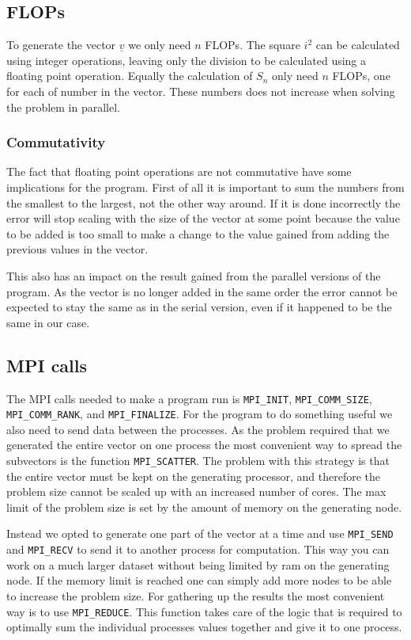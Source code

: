 \documentclass[a4paper, 12pt]{article}
\begin{document}
    \subsection{FLOPs}
    To generate the vector $\underline{v}$ we only need $n$ FLOPs. The square $i^2$ can be calculated using integer operations, leaving only the division to be calculated using a floating point operation. Equally the calculation of $S_n$ only need $n$ FLOPs, one for each of number in the vector. These numbers does not increase when solving the problem in parallel.

        \subsubsection{Commutativity}
        The fact that floating point operations are not commutative have some implications for the program. First of all it is important to sum the numbers from the smallest to the largest, not the other way around. If it is done incorrectly the error will stop scaling with the size of the vector at some point because the value to be added is too small to make a change to the value gained from adding the previous values in the vector.

        This also has an impact on the result gained from the parallel versions of the program. As the vector is no longer added in the same order the error cannot be expected to stay the same as in the serial version, even if it happened to be the same in our case.

    \subsection{MPI calls}
    The MPI calls needed to make a program run is \texttt{MPI\_INIT}, \texttt{MPI\_COMM\_SIZE}, \texttt{MPI\_COMM\_RANK}, and \texttt{MPI\_FINALIZE}. For the program to do something useful we also need to send data between the processes. As the problem required that we generated the entire vector on one process the most convenient way to spread the subvectors is the function \texttt{MPI\_SCATTER}. The problem with this strategy is that the entire vector must be kept on the generating processor, and therefore the problem size cannot be scaled up with an increased number of cores. The max limit of the problem size is set by the amount of memory on the generating node.

    Instead we opted to generate one part of the vector at a time and use \texttt{MPI\_SEND} and \texttt{MPI\_RECV} to send it to another process for computation. This way you can work on a much larger dataset without being limited by ram on the generating node. If the memory limit is reached one can simply add more nodes to be able to increase the problem size. For gathering up the results the most convenient way is to use \texttt{MPI\_REDUCE}. This function takes care of the logic that is required to optimally sum the individual processes values together and give it to one process.
\end{document}
